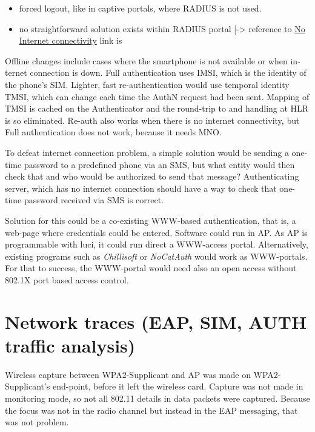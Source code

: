 \documentclass[12pt,a4paper,english]{tutthesis}
\begin{document}
\begin{otherlanguage}{english}
\begin{itemize}
\item forced logout, like in captive portals, where RADIUS is not used.
\item no straightforward solution exists within RADIUS
portal [-> reference to \hyperref[text:nointernet]{No Internet connectivity} link is
\end{itemize}

Offline changes include cases where the smartphone is not available or
when internet connection is down.  Full authentication uses IMSI,
which is the identity of the phone's SIM.  Lighter, fast
re-authentication would use temporal identity TMSI, which can change
each time the AuthN request had been sent. Mapping of TMSI is cached
on the Authenticator and the round-trip to and handling at HLR is so
eliminated. Re-auth also works when there is no internet connectivity,
but Full authentication does not work, because it needs MNO.





To defeat internet connection problem, a simple solution would be
sending a one-time password to a predefined phone via an SMS, but what
entity would then check that and who would be authorized to send that message?
Authenticating server, which has no internet connection should 
have a way to check that one-time password received via SMS is correct.

Solution for this could be a co-existing WWW-based authentication, that
is, a web-page where credentials could be entered.
Software could run in AP. As AP is programmable with luci, it could
run direct  a WWW-access portal. Alternatively, existing programs such
as \emph{Chillisoft} or \emph{NoCatAuth} would work as WWW-portals.
For that to success, the WWW-portal would need also an open access without
802.1X port based access control.


\section{Network traces (EAP, SIM, AUTH traffic analysis)}
\label{sec-5-4}
Wireless capture between WPA2-Supplicant and AP was made on
WPA2-Supplicant's end-point, before it left the wireless card. Capture was
not made in monitoring mode, so not all 802.11 details in
data packets were captured\cite{wireshark-capture}.
Because the focus was not in the radio channel but instead in the EAP messaging, that was not problem.



\end{otherlanguage}
\end{document}

